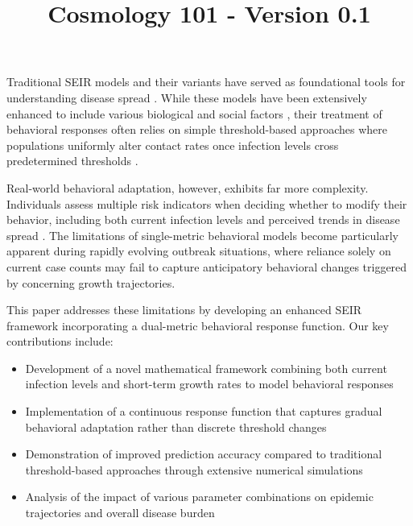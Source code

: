 \documentclass{article}\usepackage{graphicx} \usepackage{amsmath} \usepackage{colortbl}\title{Cosmology 101 - Version 0.1}
\begin{document}
Traditional SEIR models and their variants have served as foundational tools for understanding disease spread \cite{anderson1992infectious}. While these models have been extensively enhanced to include various biological and social factors \cite{hethcote2000mathematics}, their treatment of behavioral responses often relies on simple threshold-based approaches where populations uniformly alter contact rates once infection levels cross predetermined thresholds \cite{funk2010modelling}.

Real-world behavioral adaptation, however, exhibits far more complexity. Individuals assess multiple risk indicators when deciding whether to modify their behavior, including both current infection levels and perceived trends in disease spread \cite{wang2020impact}. The limitations of single-metric behavioral models become particularly apparent during rapidly evolving outbreak situations, where reliance solely on current case counts may fail to capture anticipatory behavioral changes triggered by concerning growth trajectories.

This paper addresses these limitations by developing an enhanced SEIR framework incorporating a dual-metric behavioral response function. Our key contributions include:

\begin{itemize}
\item Development of a novel mathematical framework combining both current infection levels and short-term growth rates to model behavioral responses
\item Implementation of a continuous response function that captures gradual behavioral adaptation rather than discrete threshold changes
\item Demonstration of improved prediction accuracy compared to traditional threshold-based approaches through extensive numerical simulations
\item Analysis of the impact of various parameter combinations on epidemic trajectories and overall disease burden
\end{itemize}
\end{document}
